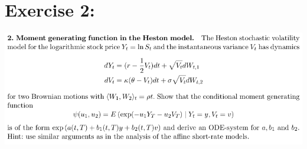 \documentclass[document.tex]{subfiles}
\begin{document}
\section*{Exercise 2:}

\includegraphics[width=\textwidth]{ex2.png}
\end{document}
